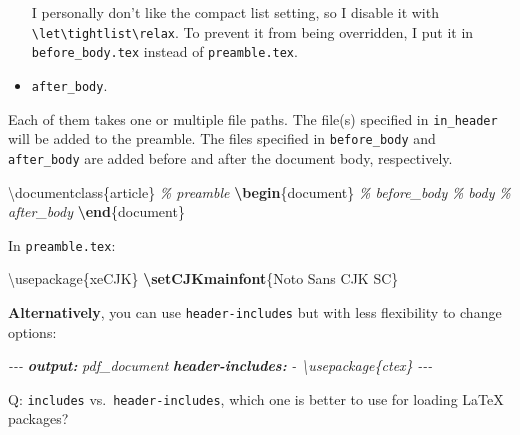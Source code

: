 \documentclass[
  a4paper,
  twoside,
  openright]{book}
\newenvironment{Shaded}{\begin{snugshade}}{\end{snugshade}}
\newcommand{\AnnotationTok}[1]{\textcolor[rgb]{0.56,0.35,0.01}{\textbf{\textit{#1}}}}
\newcommand{\BuiltInTok}[1]{#1}
\newcommand{\CommentTok}[1]{\textcolor[rgb]{0.56,0.35,0.01}{\textit{#1}}}
\newcommand{\ExtensionTok}[1]{#1}
\newcommand{\FunctionTok}[1]{\textcolor[rgb]{0.13,0.29,0.53}{\textbf{#1}}}
\newcommand{\KeywordTok}[1]{\textcolor[rgb]{0.13,0.29,0.53}{\textbf{#1}}}
\newcommand{\NormalTok}[1]{#1}
\theoremstyle{definition}
\theoremstyle{definition}
\theoremstyle{definition}
\theoremstyle{definition}
\theoremstyle{remark}
\begin{document}
\begin{itemize}
  I personally don't like the compact list setting, so I disable it with \texttt{\textbackslash{}let\textbackslash{}tightlist\textbackslash{}relax}. To prevent it from being overridden, I put it in \texttt{before\_body.tex} instead of \texttt{preamble.tex}.
\item
  \texttt{after\_body}.
\end{itemize}

Each of them takes one or multiple file paths. The file(s) specified in \texttt{in\_header} will be added to the preamble. The files specified in \texttt{before\_body} and \texttt{after\_body} are added before and after the document body, respectively.

\begin{Shaded}
\begin{Highlighting}[]
\BuiltInTok{\textbackslash{}documentclass}\NormalTok{\{}\ExtensionTok{article}\NormalTok{\}}
\CommentTok{\% preamble}
\KeywordTok{\textbackslash{}begin}\NormalTok{\{}\ExtensionTok{document}\NormalTok{\}}
\CommentTok{\% before\_body}
\CommentTok{\% body}
\CommentTok{\% after\_body}
\KeywordTok{\textbackslash{}end}\NormalTok{\{}\ExtensionTok{document}\NormalTok{\}}
\end{Highlighting}
\end{Shaded}

In \texttt{preamble.tex}:

\begin{Shaded}
\begin{Highlighting}[]
\BuiltInTok{\textbackslash{}usepackage}\NormalTok{\{}\ExtensionTok{xeCJK}\NormalTok{\}  }
\FunctionTok{\textbackslash{}setCJKmainfont}\NormalTok{\{Noto Sans CJK SC\}}
\end{Highlighting}
\end{Shaded}

\textbf{Alternatively}, you can use \texttt{header-includes} but with less flexibility to change options:

\begin{Shaded}
\begin{Highlighting}[]
\CommentTok{{-}{-}{-}}
\AnnotationTok{output:}\CommentTok{ pdf\_document}
\AnnotationTok{header{-}includes:}
\CommentTok{  {-} \textbackslash{}usepackage\{ctex\}}
\CommentTok{{-}{-}{-}}
\end{Highlighting}
\end{Shaded}

Q: \texttt{includes} vs.~\texttt{header-includes}, which one is better to use for loading LaTeX packages?
\end{document}
